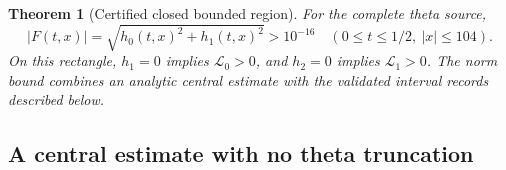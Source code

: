 \documentclass[11pt]{article}
\numberwithin{equation}{section}
\newtheorem{theorem}{Theorem}[section]
\theoremstyle{definition}
\theoremstyle{remark}
\begin{document}
\begin{theorem}[Certified closed bounded region]
\label{fc:height104}
For the complete theta source,
\begin{equation}
 |F(t,x)|=\sqrt{h_0(t,x)^2+h_1(t,x)^2}>10^{-16}
 \quad(0\le t\le1/2,\ |x|\le104).
 \label{fc:height104-gap}
\end{equation}
On this rectangle, $h_1=0$ implies $\mathcal L_0>0$, and $h_2=0$
implies $\mathcal L_1>0$.  The norm bound combines an analytic central
estimate with the validated interval records described below.
\end{theorem}

\subsection{A central estimate with no theta truncation}
\end{document}
